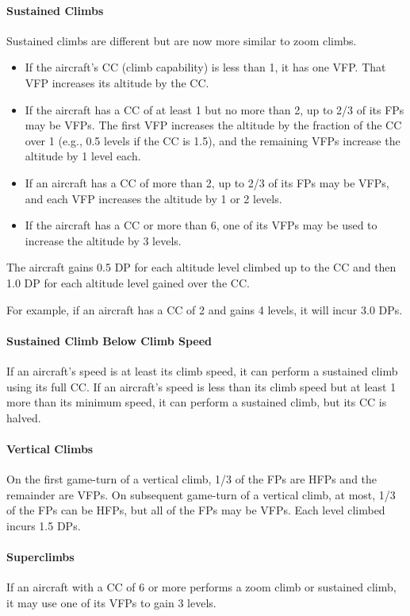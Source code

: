 \documentclass[10pt]{article}
\begin{document}
\paragraph{Sustained Climbs} Sustained climbs are different but are now more similar to zoom climbs. 
\begin{itemize}
    \item If the aircraft's CC (climb capability) is less than 1, it has one VFP. That VFP increases its altitude by the CC. 
    \item If the aircraft has a CC of at least 1 but no more than 2, up to 2/3 of its FPs may be VFPs. The first VFP increases the altitude by the fraction of the CC over 1 (e.g., 0.5 levels if the CC is 1.5), and the remaining VFPs increase the altitude by 1 level each. 
    \item If an aircraft has a CC of more than 2, up to 2/3 of its FPs may be VFPs, and each VFP increases the altitude by 1 or 2 levels.
    \item If the aircraft has a CC or more than 6, one of its VFPs may be used to increase the altitude by 3 levels.
\end{itemize}
The aircraft gains 0.5 DP for each altitude level climbed up to the CC and then 1.0 DP for each altitude level gained over the CC.

For example, if an aircraft has a CC of 2 and gains 4 levels, it will incur 3.0 DPs.

\paragraph{Sustained Climb Below Climb Speed} If an aircraft's speed is at least its climb speed, it can perform a sustained climb using its full CC. If an aircraft's speed is less than its climb speed but at least 1 more than its minimum speed, it can perform a sustained climb, but its CC is halved.

\paragraph{Vertical Climbs} On the first game-turn of a vertical climb, 1/3 of the FPs are HFPs and the remainder are VFPs. On subsequent game-turn of a vertical climb, at most, 1/3 of the FPs can be HFPs, but all of the FPs may be VFPs. Each level climbed incurs 1.5 DPs.

\paragraph{Superclimbs} If an aircraft with a CC of 6 or more performs a zoom climb or sustained climb, it may use one of its VFPs to gain 3 levels.
\end{document}
